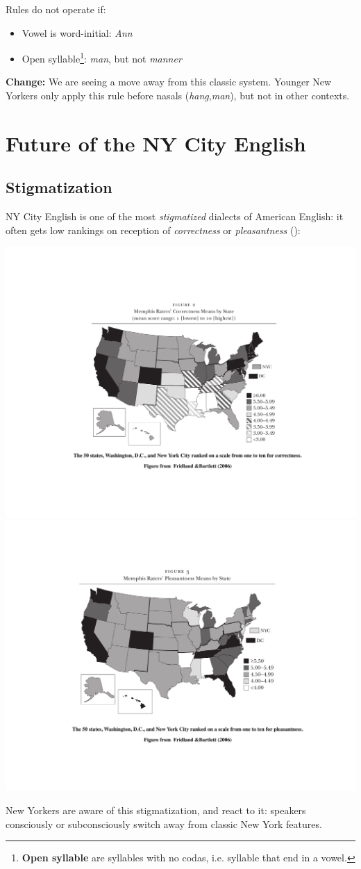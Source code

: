 \documentclass[11pt]{article}
\newcommand{\1}{$'$}
\newcommand{\2}{$''$}
\newcommand{\3}{$'''$}
\begin{document}
	Rules do not operate if:
	\begin{itemize}
		\item Vowel is word-initial: \emph{Ann}
		\item Open syllable\footnote{\textbf{Open syllable} are syllables with no codas, i.e. syllable that end in a vowel.}: \emph{man}, but not \emph{manner}
	\end{itemize}

\noindent \textbf{Change:} We are seeing a move away from this classic system. Younger New Yorkers only apply this rule before nasals (\emph{hang},\emph{man}), but not in other contexts.

\section{Future of the NY City English}

\subsection{Stigmatization}

NY City English is one of the most \emph{stigmatized} dialects of American English: it often gets low rankings on reception of \emph{correctness} or \emph{pleasantness} (\citealp{FridlandBartless:2006}):

\includegraphics[width=.45\textwidth]{ratings1}\vrule\includegraphics[width=.45\textwidth]{ratings2}

\noindent New Yorkers are aware of this stigmatization, and react to it: speakers consciously or subconsciously switch away from classic New York features.
\end{document}
